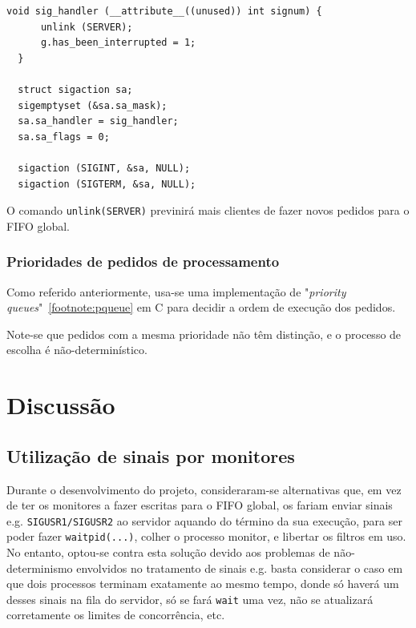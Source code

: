 \documentclass[11pt,a4paper]{report}%
\begin{document}
\label{code:server_signal}
\begin{lstlisting}[caption={Tratamento de sinais no servidor}]
  void sig_handler (__attribute__((unused)) int signum) {
      unlink (SERVER);
      g.has_been_interrupted = 1;
  }

  struct sigaction sa;
  sigemptyset (&sa.sa_mask);
  sa.sa_handler = sig_handler;
  sa.sa_flags = 0;

  sigaction (SIGINT, &sa, NULL);
  sigaction (SIGTERM, &sa, NULL);
\end{lstlisting}

O comando \lstinline{unlink(SERVER)} previnirá mais clientes de fazer novos pedidos para o FIFO global.

\subsection{Prioridades de pedidos de processamento}

Como referido anteriormente, usa-se uma implementação de "\textit{priority queues}"~\ref{footnote:pqueue} em C
para decidir a ordem de execução dos pedidos.

Note-se que pedidos com a mesma prioridade não têm distinção, e o processo de escolha é não-determinístico.

{\let\clearpage\relax \chapter{Discussão} \label{chap:disc} } %

\section{Utilização de sinais por monitores}

Durante o desenvolvimento do projeto, consideraram-se alternativas que, em vez de ter os monitores a fazer
escritas para o FIFO global, os fariam enviar sinais e.g. \texttt{SIGUSR1/SIGUSR2} ao servidor aquando do
término da sua execução, para ser poder fazer \lstinline{waitpid(...)}, colher o processo monitor, e libertar
os filtros em uso.\\

No entanto, optou-se contra esta solução devido aos problemas de não-determinismo envolvidos no tratamento de sinais
e.g. basta considerar o caso em que dois processos terminam exatamente ao mesmo tempo, donde só haverá um desses
sinais na fila do servidor, só se fará \lstinline{wait} uma vez, não se atualizará corretamente os limites de
concorrência, etc.
\end{document}

